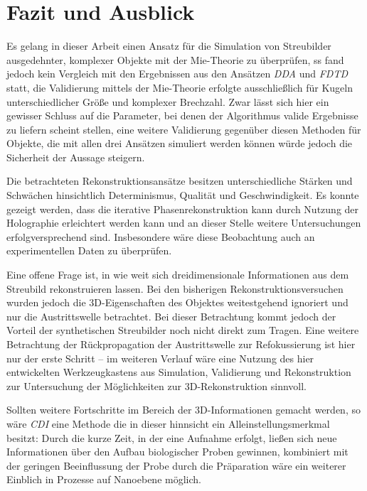 \chapter{Fazit und Ausblick}
Es gelang in dieser Arbeit einen Ansatz für die Simulation von Streubilder  ausgedehnter, komplexer Objekte mit der Mie-Theorie zu überprüfen, ss fand jedoch kein Vergleich mit den Ergebnissen aus den Ansätzen \textit{DDA} und \textit{FDTD} statt, die Validierung mittels der Mie-Theorie erfolgte ausschließlich für Kugeln unterschiedlicher Größe und komplexer Brechzahl. Zwar lässt sich hier ein gewisser Schluss auf die Parameter, bei denen der Algorithmus valide Ergebnisse zu liefern scheint stellen, eine weitere Validierung gegenüber diesen Methoden für Objekte, die mit allen drei Ansätzen simuliert werden können würde jedoch die Sicherheit der Aussage steigern.

Die betrachteten Rekonstruktionsansätze besitzen unterschiedliche Stärken und Schwächen hinsichtlich Determinismus, Qualität und Geschwindigkeit. Es konnte gezeigt werden, dass die iterative Phasenrekonstruktion kann durch Nutzung der Holographie erleichtert werden kann und an dieser Stelle weitere Untersuchungen erfolgversprechend sind. Insbesondere wäre diese Beobachtung auch an experimentellen Daten zu überprüfen.

Eine offene Frage ist, in wie weit sich dreidimensionale Informationen aus dem Streubild rekonstruieren lassen. Bei den bisherigen Rekonstruktionsversuchen wurden jedoch die 3D-Eigenschaften des Objektes weitestgehend ignoriert und nur die Austrittswelle betrachtet. Bei dieser Betrachtung kommt jedoch der Vorteil der synthetischen Streubilder noch nicht direkt zum Tragen. Eine weitere Betrachtung der Rückpropagation der Austrittswelle zur Refokussierung ist hier nur der erste Schritt -- im weiteren Verlauf wäre eine Nutzung des hier entwickelten Werkzeugkastens aus Simulation, Validierung und Rekonstruktion zur Untersuchung der Möglichkeiten zur 3D-Rekonstruktion sinnvoll. 

Sollten weitere Fortschritte im Bereich der 3D-Informationen gemacht werden, so wäre \textit{CDI} eine Methode die in dieser hinnsicht ein Alleinstellungsmerkmal besitzt: Durch die kurze Zeit, in der eine Aufnahme erfolgt, ließen sich neue Informationen über den Aufbau biologischer Proben gewinnen, kombiniert mit der geringen Beeinflussung der Probe durch die Präparation wäre ein weiterer Einblich in Prozesse auf Nanoebene möglich. 